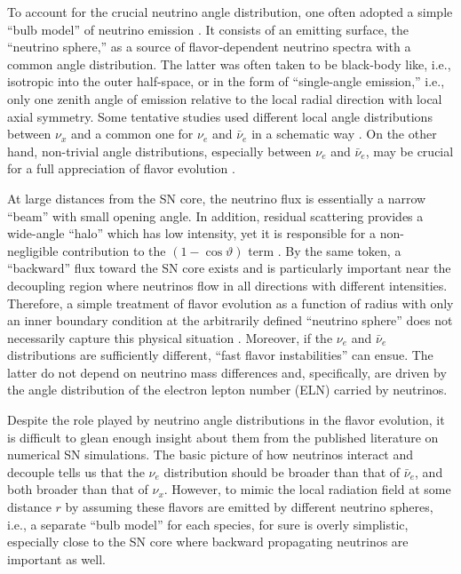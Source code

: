 \documentclass[iop,twocolappendix,numberedappendix]{emulateapj}
\begin{document}
To account for the crucial neutrino angle distribution, one often
adopted a simple ``bulb model'' of neutrino emission \citep{Duan:2006an}. It
consists of an emitting surface, the ``neutrino sphere,'' as a source of
flavor-dependent neutrino spectra with a common angle distribution. The
latter was often taken to be black-body like, i.e., isotropic into the outer
half-space, or in the form of ``single-angle emission,'' i.e., only one
zenith angle of emission relative to the local radial direction with local
axial symmetry. Some tentative studies used different local angle
distributions between $\nu_x$ and a common one for $\nu_e$ and $\bar\nu_e$ in
a schematic way \citep{Mirizzi:2011tu}. On the other hand, non-trivial angle
distributions, especially between $\nu_e$ and $\bar\nu_e$, may be crucial for
a full appreciation of flavor evolution
\citep{Sawyer:2005jk,Sawyer:2008zs,Sawyer:2015dsa,Chakraborty:2016lct,Dasgupta:2016dbv,Izaguirre:2016gsx,Wu:2017qpc}.

At large distances from the SN core, the neutrino flux is essentially a
narrow ``beam'' with small opening angle. 
In addition, residual scattering
provides a wide-angle ``halo'' which has low intensity, yet  it is responsible for a non-negligible 
contribution to the $(1-\cos\vartheta)$ term \citep{Cherry:2012zw,Sarikas:2012vb}.
By the same token, a ``backward'' flux toward the SN core exists and is
particularly important near the decoupling region where neutrinos flow in all
directions with different intensities. Therefore, a simple treatment of
flavor evolution as a function of radius with only an inner boundary
condition at the arbitrarily defined ``neutrino sphere'' does not necessarily
capture this physical situation \citep{Izaguirre:2016gsx}.  Moreover, if the
$\nu_e$ and $\bar\nu_e$ distributions are sufficiently different, ``fast
flavor instabilities'' can ensue. The latter do not depend on neutrino mass
differences and, specifically, are driven by the angle distribution of the
electron lepton number (ELN) carried by neutrinos.

Despite the role played by neutrino angle distributions in the flavor
evolution, it is difficult to glean enough insight about them from the
published literature on numerical SN simulations. The basic picture of how
neutrinos interact and decouple tells us that the $\nu_e$ distribution should
be broader than that of $\bar\nu_e$, and both broader than that of $\nu_x$.
However, to mimic the local radiation field at some distance $r$ by assuming
these flavors are emitted by different neutrino spheres, i.e., a separate
``bulb model'' for each species, for sure is overly simplistic, especially
close to the SN core where backward propagating neutrinos are important as well.
\end{document}
